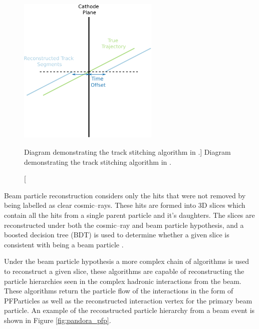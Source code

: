 \begin{figure}
	\centering
	\includegraphics[width=0.6\textwidth]{figures/track_stitch.pdf}
	\caption
	[Diagram demonstrating the track stitching algorithm in \protodune{}.]
	{Diagram demonstrating the track stitching algorithm in \protodune{}.}
	\label{fig:track_stitching}
\end{figure}

Beam particle reconstruction considers only the hits that were not removed by 
being labelled as clear cosmic--rays. These hits are formed into 3D slices which
contain all the hits from a single parent particle and it's daughters. The
slices are reconstructed under both the cosmic--ray and beam particle
hypothesis, and a boosted decision tree (BDT) is used to determine whether a 
given slice is consistent with being a beam particle \cite{TODO}. 

Under the beam particle hypothesis a more complex chain of algorithms is used to
reconstruct a given slice, these algorithms are capable of reconstructing the
particle hierarchies seen in the complex hadronic interactions from the
\protodune{} beam. These algorithms return the particle flow of the interactions
in the form of PFParticles as well as the reconstructed interaction vertex for
the primary beam particle. An example of the reconstructed particle hierarchy
from a \protodune{} beam event is shown in Figure \ref{fig:pandora_pfp}.

